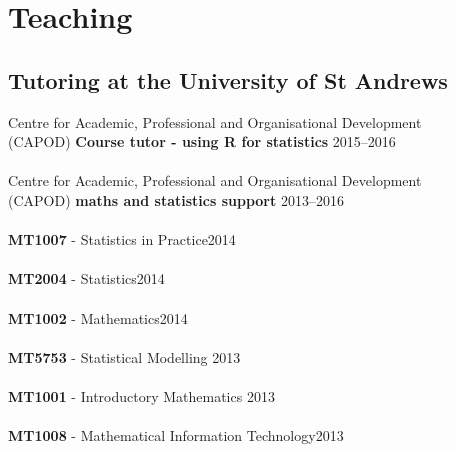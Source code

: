 \documentclass[10pt,letter]{article}
\begin{document}
\section*{Teaching}
\vspace{1mm}
 \subsection*{Tutoring at the University of St Andrews}
 \vspace{1mm}
 
 Centre for Academic, Professional and Organisational Development\\ (CAPOD) \textbf{Course tutor - using R for statistics} \hfill{2015--2016}\\
 \hdashrule[0.5ex]{4cm}{1pt}{1pt}\\
  Centre for Academic, Professional and Organisational Development\\ (CAPOD) \textbf{maths and statistics support} \hfill{2013--2016}\\
 \hdashrule[0.5ex]{4cm}{1pt}{1pt}\\
\textbf{MT1007} -  Statistics in Practice\hfill{2014}\\
 \hdashrule[0.5ex]{4cm}{1pt}{1pt}\\
  \textbf{MT2004} -  Statistics\hfill{2014}\\
 \hdashrule[0.5ex]{4cm}{1pt}{1pt}\\
  \textbf{MT1002} -  Mathematics\hfill{2014}\\
 \hdashrule[0.5ex]{4cm}{1pt}{1pt}\\
 \textbf{MT5753} -  Statistical Modelling \hfill{2013}\\
 \hdashrule[0.5ex]{4cm}{1pt}{1pt}\\
\textbf{MT1001} -  Introductory Mathematics \hfill{2013}\\
 \hdashrule[0.5ex]{4cm}{1pt}{1pt}\\
 \textbf{MT1008} -  Mathematical Information Technology\hfill{2013}\\
\end{document}
